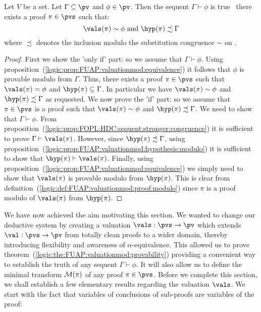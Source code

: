 \begin{theorem}\label{logic:the:FUAP:valuationmod:provability}
Let $V$ be a set. Let $\Gamma\subseteq\pv$ and $\phi\in\pv$. Then
the sequent $\Gamma\vdash\phi$ is true \ifand\ there exists a proof
$\pi\in\pvs$ such that:
    \[
    \vals(\pi)\sim\phi\mbox{\ and\ }\hyp(\pi)\precsim\Gamma
    \]
where $\precsim$ denotes the inclusion modulo the substitution
congruence $\sim$ on \pv.
\end{theorem}
\begin{proof}
First we show the 'only if' part: so we assume that
$\Gamma\vdash\phi$. Using
proposition~(\ref{logic:prop:FUAP:valuationmod:equivalence}) it
follows that $\phi$ is provable modulo from $\Gamma$. Thus, there
exists a proof $\pi\in\pvs$ such that $\vals(\pi)=\phi$ and
$\hyp(\pi)\subseteq\Gamma$. In particular we have
$\vals(\pi)\sim\phi$ and $\hyp(\pi)\precsim\Gamma$ as requested. We
now prove the 'if' part: so we assume that $\pi\in\pvs$ is a proof
such that $\vals(\pi)\sim\phi$ and $\hyp(\pi)\precsim\Gamma$. We
need to show that $\Gamma\vdash\phi$. From
proposition~(\ref{logic:prop:FOPL:HDC:sequent:stronger:congruence})
it is sufficient to prove $\Gamma\vdash\vals(\pi)$. However, since
$\hyp(\pi)\precsim\Gamma$, using
proposition~(\ref{logic:prop:FUAP:valuationmod:hypothesis:modulo})
it is sufficient to show that $\hyp(\pi)\vdash\vals(\pi)$. Finally,
using proposition~(\ref{logic:prop:FUAP:valuationmod:equivalence})
we simply need to show that $\vals(\pi)$ is provable modulo from
$\hyp(\pi)$. This is clear from
definition~(\ref{logic:def:FUAP:valuationmod:proof:modulo}) since
$\pi$ is a proof modulo of $\vals(\pi)$ from $\hyp(\pi)$.
\end{proof}

We have now achieved the  aim motivating this section. We wanted to
change our deductive system by creating a valuation
$\vals:\pvs\to\pv$ which extends $\val:\pvs\to\pv$ from totally
clean proofs to a wider domain, thereby introducing flexibility and
awareness of $\alpha$-equivalence. This allowed us to prove
theorem~(\ref{logic:the:FUAP:valuationmod:provability}) providing a
convenient way to establish the truth of any sequent
$\Gamma\vdash\phi$. It will also allow us to define the minimal
transform ${\cal M}(\pi)$ of any proof $\pi\in\pvs$. Before we
complete this section, we shall establish a few elementary results
regarding the valuation $\vals$. We start with the fact that
variables of conclusions of sub-proofs are variables of the proof:

